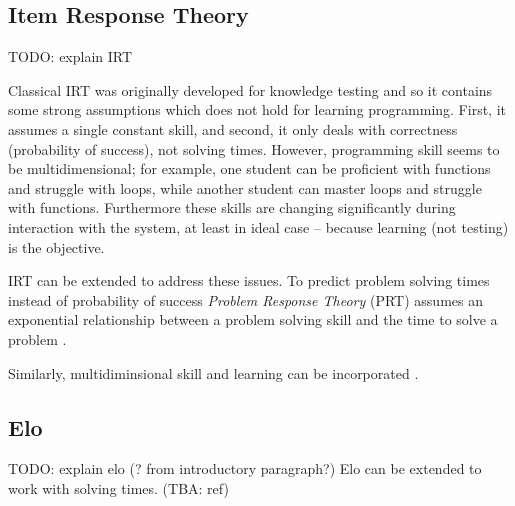 
\subsection{Item Response Theory}
\label{sec:irt}

TODO: explain IRT


Classical IRT was originally developed for knowledge testing
  and so it contains some strong assumptions which does not hold for learning programming.
First, it assumes a single constant skill, and
second, it only deals with correctness (probability of success), not solving times.
However, programming skill seems to be multidimensional;
  for example, one student can be proficient with functions and struggle with loops,
  while another student can master loops and struggle with functions.
Furthermore these skills are changing significantly during interaction with the system,
  at least in ideal case -- because learning (not testing) is the objective.

IRT can be extended to address these issues.
To predict problem solving times instead of probability of success
  \emph{Problem Response Theory} (PRT)
  assumes an exponential relationship between a problem solving skill
  and the time to solve a problem  %
  \cite{alg.problem-response-theory}.

Similarly, multidiminsional skill and learning can be incorporated
  \cite{pelanek-student-modeling-times}.

\subsection{Elo}
\label{sec:elo}

TODO: explain elo (? from introductory paragraph?) \cite{alg.elo}
Elo can be extended to work with solving times. (TBA: ref)

